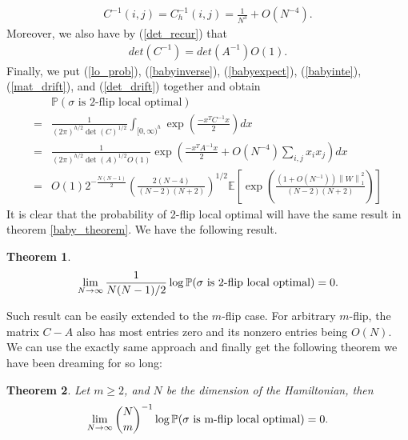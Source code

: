 \documentclass[10pt]{article}
\newcommand{\e}{\mathbb{E}}
\newcommand{\p}{\mathbb{P}}
\newcommand{\norm}[1]{\left\lVert#1\right\rVert}
\newtheorem{theorem}{\bf Theorem}
\newenvironment{Proof of lemma}{\noindent{\bf Proof of Lemma}}{\hfill$\Box$\newline}
\newenvironment{Proof of claim}{\noindent{\bf Proof of claim}}{\hfill$\Box$\newline}
\newenvironment{Proof of theorem}{\noindent{\bf Proof of Theorem}}{\hfill\scriptsize{$\Box$}\newline}
\newenvironment{Proof of theorems}{\noindent{\bf Proof of Theorems}}{\hfill$\Box$\newline}
\newenvironment{Proof of proposition}{\noindent{\bf Proof of Proposition}}{\hfill$\Box$\newline}
\newenvironment{Proof of propositions}{\noindent{\bf Proof of Propositions}}{\hfill$\Box$\newline}
\newenvironment{Proof of exercise}{\noindent{\it Proof of Exercise:}}{\hfill$\Box$}
\numberwithin{equation}{section}
\begin{document}
\begin{align}
    C^{-1}(i,j) = C_h^{-1}(i,j) = \frac{1}{N^3} + O(N^{-4}).
\end{align}
Moreover, we also have by (\ref{det_recur}) that
\begin{align} \label{det_drift}
    det(C^{-1}) = det(A^{-1})O(1).
\end{align}
Finally, we put (\ref{lo_prob}), (\ref{babyinverse}), (\ref{babyexpect}), (\ref{babyinte}), (\ref{mat_drift}), and (\ref{det_drift}) together and obtain
\begin{align}
    &\p(\sigma \text{ is 2-flip local optimal}) \nonumber \\
    =& \frac{1}{(2\pi)^{h/2}\det(C)^{1/2}}\int_{[0,\infty)^h} \exp\left(\frac{-x^{T}C^{-1}x}{2}\right)dx \nonumber \\
    =& \frac{1}{(2\pi)^{h/2}\det(A)^{1/2}O(1)} \exp\left(\frac{-x^{T}A^{-1}x}{2} + O(N^{-4})\sum_{i,j}x_ix_j\right)dx \nonumber \\
    =& O(1) 2^{-\frac{N(N-1)}{2}}\left( \frac{2(N-4)}{(N-2)(N+2)}\right)^{1/2} \e \left[ \exp\left(\frac{(1+O(N^{-1}))\norm{W}^2_1}{(N-2)(N+2)}\right)\right]
\end{align}
It is clear that the probability of 2-flip local optimal will have the same result in theorem \ref{baby_theorem}. We have the following result.
\begin{theorem}
    \begin{align}
        \lim_{N \to \infty}\frac{1}{N(N-1)/2} \log \p(\sigma \text{ \normalfont is 2-flip local optimal}) = 0.
    \end{align}
\end{theorem}
Such result can be easily extended to the $m$-flip case. For arbitrary $m$-flip, the matrix $C-A$ also has most entries zero and its nonzero entries being $O(N)$. We can use the exactly same approach and finally get the following theorem we have been dreaming for so long:
\begin{theorem}
    Let $m \geq 2$, and $N$ be the dimension of the Hamiltonian, then
    \begin{align}
        \lim_{N \to \infty}\binom{N}{m}^{-1} \log \p(\sigma \text{ \normalfont is m-flip local optimal}) = 0.
    \end{align}
\end{theorem}
\end{document}
